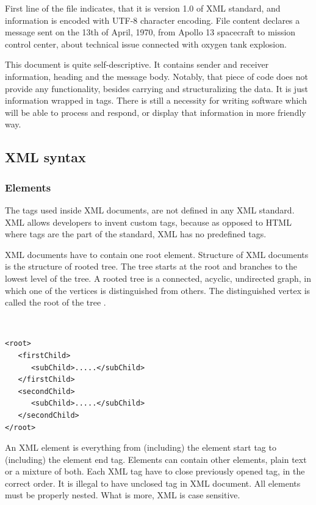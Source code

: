 \noindent First line of the file indicates, that it is version 1.0 of XML standard, and information is encoded with UTF-8 character encoding. File content declares a message sent on the 13th of April, 1970, from Apollo 13 spacecraft to mission control center, about technical issue connected with oxygen tank explosion. 

This document is quite self-descriptive. It contains sender and receiver information, heading and the message body. Notably, that piece of code does not provide any functionality, besides carrying and structuralizing the data. It is just information wrapped in tags. There is still a necessity for writing software which will be able to process and respond, or display that information in more friendly way.

\subsection{XML syntax}
\label{sub:xmlSyntax}

\subsubsection{Elements}
\label{sss:xmlElements}

The tags used inside XML documents, are not defined in any XML standard. XML allows developers to invent custom tags, because as opposed to HTML where tags are the part of the standard, XML has no predefined tags.

XML documents have to contain one root element. Structure of XML documents is the structure of rooted tree. The tree starts at the root and branches to the lowest level of the tree. A rooted tree is a connected, acyclic, undirected graph, in which one of the vertices is distinguished from others. The distinguished vertex is called the root of the tree \cite{CLR90}.

\newpage

{\tt \small
\begin{verbatim}
<root>
   <firstChild>
      <subChild>.....</subChild>
   </firstChild>
   <secondChild>
      <subChild>.....</subChild>
   </secondChild>
</root>
\end{verbatim}
}

\noindent An XML element is everything from (including) the element start tag to (including) the element end tag. Elements can contain other elements, plain text or a mixture of both. Each XML tag have to close previously opened tag, in the correct order. It is illegal to have unclosed tag in XML document. All elements must be properly nested. What is more, XML is case sensitive.

